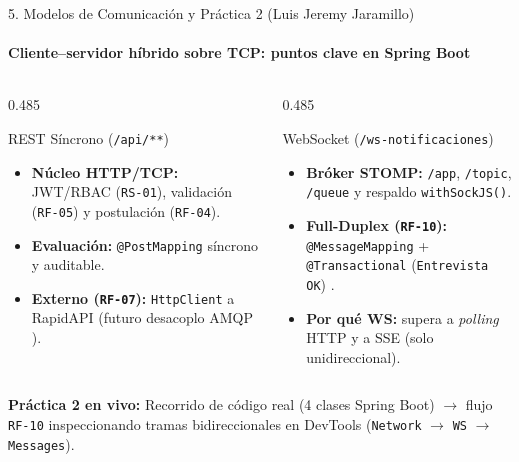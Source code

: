 \documentclass[aspectratio=169,10pt]{beamer}
\begin{document}
\begin{frame}{5. Modelos de Comunicación y Práctica 2 (Luis Jeremy Jaramillo)}
  \framesubtitle{Cliente--servidor híbrido sobre TCP: puntos clave en Spring Boot \cite{ref3,ref4,petrescu2025iotprotocols}}
  \vspace{0.10cm}
  \begin{columns}[T,totalwidth=\textwidth]
    \begin{column}{0.485\textwidth}
      \begin{bluecard}{REST Síncrono (\texttt{/api/**})}
        \footnotesize
        \begin{itemize}\setlength{\itemsep}{5pt}
          \item \textbf{Núcleo HTTP/TCP:} JWT/RBAC (\texttt{RS-01}), validación (\texttt{RF-05}) y postulación (\texttt{RF-04}).
          \item \textbf{Evaluación:} \texttt{@PostMapping} síncrono y auditable.
          \item \textbf{Externo (\texttt{RF-07}):} \texttt{HttpClient} a RapidAPI (futuro desacoplo AMQP \cite{petrescu2025iotprotocols}).
        \end{itemize}
      \end{bluecard}
    \end{column}
    \begin{column}{0.485\textwidth}
      \begin{ambercard}{WebSocket (\texttt{/ws-notificaciones})}
        \footnotesize
        \begin{itemize}\setlength{\itemsep}{5pt}
          \item \textbf{Bróker STOMP:} \texttt{/app}, \texttt{/topic}, \texttt{/queue} y respaldo \texttt{withSockJS()}.
          \item \textbf{Full-Duplex (\texttt{RF-10}):} \texttt{@MessageMapping} + \texttt{@Transactional} (\texttt{Entrevista OK}) \cite{mitrovic2023websocket}.
          \item \textbf{Por qué WS:} supera a \textit{polling} HTTP y a SSE (solo unidireccional).
        \end{itemize}
      \end{ambercard}
    \end{column}
  \end{columns}
  \vspace{0.25cm}
  \begin{demobar}
    \textcolor{AmberAccent}{\textbf{Práctica 2 en vivo:}} Recorrido de código real (4 clases Spring Boot) $\rightarrow$ flujo \texttt{RF-10} inspeccionando tramas bidireccionales en DevTools (\texttt{Network} $\rightarrow$ \texttt{WS} $\rightarrow$ \texttt{Messages}).
  \end{demobar}
\end{frame}
\end{document}
